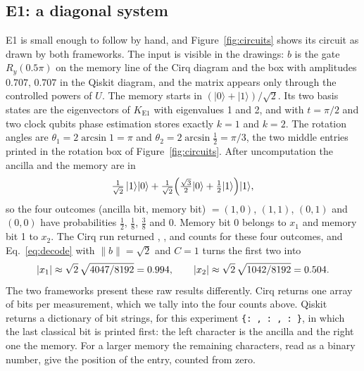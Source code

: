 \documentclass[manuscript,screen,review,nonacm]{acmart}
\newcommand{\ket}[1]{\lvert #1\rangle}
\newcommand{\norm}[1]{\lVert #1\rVert}
\newcommand{\code}[1]{\texttt{#1}}
\begin{document}
\subsection{E1: a diagonal system}
\label{sec:e1}

E1 is small enough to follow by hand, and Figure~\ref{fig:circuits} shows its
circuit as drawn by both frameworks. The input is visible in the drawings: $b$
is the gate $R_y(0.5\pi)$ on the memory line of the Cirq diagram and the box
with amplitudes $0.707,\,0.707$ in the Qiskit diagram, and the matrix appears
only through the controlled powers of $U$. The memory starts in
$(\ket{0}+\ket{1})/\sqrt2$. Its two basis states are the eigenvectors of
$K_{\mathrm{E1}}$ with eigenvalues 1 and 2, and with $t=\pi/2$ and two clock
qubits phase estimation stores exactly $k=1$ and $k=2$. The rotation angles
are $\theta_1=2\arcsin 1=\pi$ and $\theta_2=2\arcsin\tfrac12=\pi/3$, the two
middle entries printed in the rotation box of Figure~\ref{fig:circuits}.
After uncomputation the ancilla and the memory are in
\begin{equation}
  \tfrac{1}{\sqrt2}\,\ket{1}\ket{0}
  +\tfrac{1}{\sqrt2}\Bigl(\tfrac{\sqrt3}{2}\ket{0}+\tfrac12\ket{1}\Bigr)\ket{1},
\end{equation}
so the four outcomes (ancilla bit, memory bit) $=(1,0)$, $(1,1)$, $(0,1)$ and
$(0,0)$ have probabilities $\tfrac12$, $\tfrac18$, $\tfrac38$ and $0$. Memory
bit 0 belongs to $x_1$ and memory bit 1 to $x_2$. The Cirq run returned
\EOneCirqCountOneZero, \EOneCirqCountOneOne, \EOneCirqCountZeroOne{} and
\EOneCirqCountZeroZero{} counts for these four outcomes, and
Eq.~\eqref{eq:decode} with $\norm{b}=\sqrt2$ and $C=1$ turns the first two
into
\begin{equation}
  |x_1|\approx\sqrt2\,\sqrt{4047/8192}=0.994,
  \qquad
  |x_2|\approx\sqrt2\,\sqrt{1042/8192}=0.504 .
\end{equation}
The two frameworks present these raw results differently. Cirq returns one
array of bits per measurement, which we tally into the four counts above.
Qiskit returns a dictionary of bit strings, for this experiment
\code{\{\textquotesingle:\,\EOneQiskitCountOneZero,
\textquotesingle 01\textquotesingle:\,\EOneQiskitCountZeroOne,
\textquotesingle 11\textquotesingle:\,\EOneQiskitCountOneOne\}}, in which the last classical bit is printed
first: the left character is the ancilla and the right one the memory. For a
larger memory the remaining characters, read as a binary number, give the
position of the entry, counted from zero.
\end{document}
